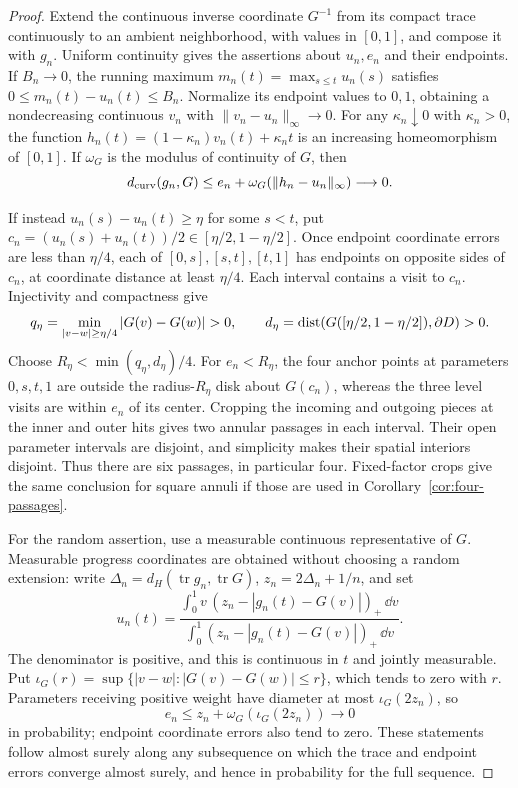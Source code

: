 \begin{proof}
Extend the continuous inverse coordinate $G^{-1}$ from its compact
trace continuously to an ambient neighborhood, with values in
$[0,1]$, and compose it with $g_n$.  Uniform continuity gives the
assertions about $u_n,e_n$ and their endpoints.  If $B_n\to0$,
the running maximum $m_n(t)=\max_{s\le t}u_n(s)$ satisfies
$0\le m_n(t)-u_n(t)\le B_n$.  Normalize its endpoint values to
$0,1$, obtaining a nondecreasing continuous $v_n$ with
$\|v_n-u_n\|_\infty\to0$.  For any $\kappa_n\downarrow0$ with
$\kappa_n>0$, the function
$h_n(t)=(1-\kappa_n)v_n(t)+\kappa_n t$ is an increasing
homeomorphism of $[0,1]$.  If $\omega_G$ is the modulus of
continuity of $G$, then
\[
 d_{\rm curv}(g_n,G)
 \le e_n+\omega_G(\|h_n-u_n\|_\infty)\longrightarrow0.
\]

If instead $u_n(s)-u_n(t)\ge\eta$ for some $s<t$, put
$c_n=(u_n(s)+u_n(t))/2\in[\eta/2,1-\eta/2]$.  Once endpoint
coordinate errors are less than $\eta/4$, each of $[0,s],[s,t],[t,1]$
has endpoints on opposite sides of $c_n$, at coordinate distance
at least $\eta/4$.  Each interval contains a visit to $c_n$.
Injectivity and compactness give
\[
 q_\eta=\min_{|v-w|\ge\eta/4}|G(v)-G(w)|>0,\qquad
 d_\eta=\dist(G([\eta/2,1-\eta/2]),\partial D)>0.
\]
Choose $R_\eta<\min(q_\eta,d_\eta)/4$.  For $e_n<R_\eta$,
the four anchor points at parameters $0,s,t,1$ are outside the
radius-$R_\eta$ disk about $G(c_n)$, whereas the three level visits
are within $e_n$ of its center.  Cropping the incoming and outgoing
pieces at the inner and outer hits gives two annular passages in
each interval.  Their open parameter intervals are disjoint, and
simplicity makes their spatial interiors disjoint.  Thus there are
six passages, in particular four.  Fixed-factor crops give the same
conclusion for square annuli if those are used in
Corollary~\ref{cor:four-passages}.

For the random assertion, use a measurable continuous representative
of $G$.  Measurable progress coordinates are obtained without choosing
a random extension: write
$\Delta_n=d_H(\operatorname{tr}g_n,\operatorname{tr}G)$,
$z_n=2\Delta_n+1/n$, and set
\[
 u_n(t)=
 \frac{\displaystyle\int_0^1 v\,(z_n-|g_n(t)-G(v)|)_+\,\dd v}
 {\displaystyle\int_0^1 (z_n-|g_n(t)-G(v)|)_+\,\dd v}.
\]
The denominator is positive, and this is continuous in $t$ and
jointly measurable.  Put
$\iota_G(r)=\sup\{|v-w|:|G(v)-G(w)|\le r\}$, which tends to
zero with $r$.  Parameters receiving positive weight have diameter
at most $\iota_G(2z_n)$, so
\[
 e_n\le z_n+\omega_G(\iota_G(2z_n))\longrightarrow0
\]
in probability; endpoint coordinate errors also tend to zero.
These statements follow almost surely along any subsequence on
which the trace and endpoint errors converge almost surely, and
hence in probability for the full sequence.


\end{proof}
